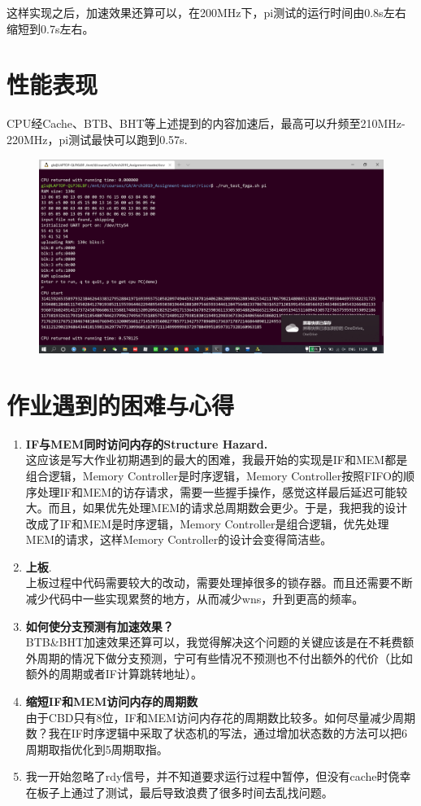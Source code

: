 \documentclass[a4paper,UTF8]{article}
\begin{document}
这样实现之后，加速效果还算可以，在200MHz下，pi测试的运行时间由0.8s左右缩短到0.7s左右。
\newpage
\section{性能表现}
CPU经Cache、BTB、BHT等上述提到的内容加速后，最高可以升频至210MHz-220MHz，pi测试最快可以跑到0.57s.
\begin{figure}[h]
    \centering
	\includegraphics[width=1\linewidth]{5.png}
\end{figure}

\section{作业遇到的困难与心得}
\begin{enumerate}
    \item \textbf{IF与MEM同时访问内存的Structure Hazard.}\\
        这应该是写大作业初期遇到的最大的困难，我最开始的实现是IF和MEM都是组合逻辑，Memory Controller是时序逻辑，Memory Controller按照FIFO的顺序处理IF和MEM的访存请求，需要一些握手操作，感觉这样最后延迟可能较大。而且，如果优先处理MEM的请求总周期数会更少。于是，我把我的设计改成了IF和MEM是时序逻辑，Memory Controller是组合逻辑，优先处理MEM的请求，这样Memory Controller的设计会变得简洁些。
    \item \textbf{上板}.\\
    上板过程中代码需要较大的改动，需要处理掉很多的锁存器。而且还需要不断减少代码中一些实现累赘的地方，从而减少wns，升到更高的频率。
    \item \textbf{如何使分支预测有加速效果？}\\
    BTB\&BHT加速效果还算可以，我觉得解决这个问题的关键应该是在不耗费额外周期的情况下做分支预测，宁可有些情况不预测也不付出额外的代价（比如额外的周期或者IF计算跳转地址）。
    \item \textbf{缩短IF和MEM访问内存的周期数}\\
    由于CBD只有8位，IF和MEM访问内存花的周期数比较多。如何尽量减少周期数？我在IF时序逻辑中采取了状态机的写法，通过增加状态数的方法可以把6周期取指优化到5周期取指。
    \item 我一开始忽略了rdy信号，并不知道要求运行过程中暂停，但没有cache时侥幸在板子上通过了测试，最后导致浪费了很多时间去乱找问题。
\end{enumerate}
\end{document}
